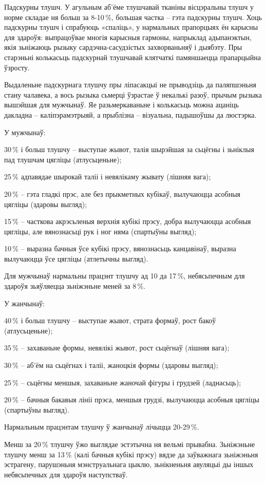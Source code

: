 Падскурны тлушч. У агульным аб'ёме тлушчавай тканіны вісцэральны тлушч у норме складае ня больш за 8-10\,\%, большая частка – гэта падскурны тлушч. Хоць падскурны тлушч і спрабуюць «спаліць», у нармальных прапорцыях ён карысны для здароўя: выпрацоўвае многія карысныя гармоны, напрыклад адыпанэктын, якія зьніжаюць рызыку сардэчна-сасудзістых захворваньняў і дыябэту. Пры старэньні колькасьць падскурнай тлушчавай клятчаткі памяншаецца прапарцыйна ўзросту.

Выдаленьне падскурнага тлушчу пры ліпасакцыі не прыводзіць да паляпшэньня стану чалавека, а вось рызыка сьмерці ўзрастае ў некалькі разоў, прычым рызыка вышэйшая для мужчынаў. Яе разьмеркаваньне і колькасьць можна ацаніць дакладна – каліпэрамэтрыяй, а прыблізна – візуальна, падышоўшы да люстэрка.

У мужчынаў:

30\,\% і больш тлушчу – выступае жывот, талія шырэйшая за сьцёгны і зьніклыя пад тлушчам цягліцы (атлусьценьне);

25\,\% адпавядае шырокай таліі і невялікаму жывату (лішняя вага);

20\,\% – гэта гладкі прэс, але без прыкметных кубікаў, вылучаюцца асобныя цягліцы (здаровы выгляд);

15\,\% – часткова акрэсьленыя верхнія кубікі прэсу, добра вылучаюцца асобныя цягліцы, але вянознасьці рук і ног няма (спартыўны выгляд);

10\,\% – выразна бачныя ўсе кубікі прэсу, вянознасьць канцавінаў, выразна вылучаюцца ўсе цягліцы (атлетычны выгляд).

Для мужчынаў нармальны працэнт тлушчу ад 10 да 17\,\%, небясьпечным для здароўя зьяўляецца зьніжэньне меней за 8\,\%.

У жанчынаў:

40\,\% і больш тлушчу – выступае жывот, страта формаў, рост бакоў (атлусьценьне);

35\,\% – захаваньне формы, невялікі жывот, рост сьцёгнаў (лішняя вага);

30\,\% – аб'ём на сьцёгнах і таліі, жаноцкія формы (здаровы выгляд);

25\,\% – сьцёгны меншыя, захаваньне жаночай фігуры і грудзей (ладнасьць);

20\,\% – бачныя бакавыя лініі прэса, меншыя грудзі, вылучаюцца асобныя цягліцы (спартыўны выгляд).

Нармальным працэнтам тлушчу ў жанчынаў лічыцца 20-29\,\%.

Менш за 20\,\% тлушчу ўжо выглядае эстэтычна ня вельмі прывабна. Зьніжэньне тлушчу менш за 13\,\% (калі бачныя кубікі прэсу) вядзе да заўважнага зьніжэньня эстрагену, парушэньня мэнструальнага цыклю, зьнікненьня авуляцыі ды іншых небясьпечных для здароўя наступстваў.

